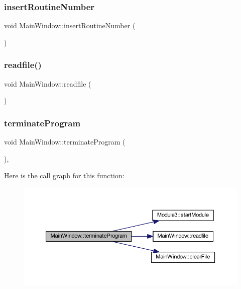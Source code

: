 \subsubsection{\texorpdfstring{insert\+Routine\+Number}{insertRoutineNumber}}
{\footnotesize\ttfamily void Main\+Window\+::insert\+Routine\+Number (\begin{DoxyParamCaption}{ }\end{DoxyParamCaption})\hspace{0.3cm}{\ttfamily [signal]}}

\mbox{\label{class_main_window_a45eac78192a605f450c10b8c4b1bde81}} 
\subsubsection{\texorpdfstring{readfile()}{readfile()}}
{\footnotesize\ttfamily void Main\+Window\+::readfile (\begin{DoxyParamCaption}{ }\end{DoxyParamCaption})}

\mbox{\label{class_main_window_aab2fed34f5ba1468a0c9ff35fcd79757}} 
\subsubsection{\texorpdfstring{terminate\+Program}{terminateProgram}}
{\footnotesize\ttfamily void Main\+Window\+::terminate\+Program (\begin{DoxyParamCaption}{ }\end{DoxyParamCaption})\hspace{0.3cm}{\ttfamily [private]}, {\ttfamily [slot]}}

Here is the call graph for this function\+:
\nopagebreak
\begin{figure}[H]
\begin{center}
\leavevmode
\includegraphics[width=350pt]{class_main_window_aab2fed34f5ba1468a0c9ff35fcd79757_cgraph}
\end{center}
\end{figure}


